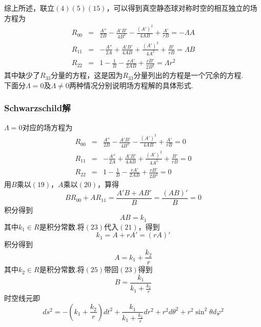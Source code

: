         综上所述，联立$(4)(5)(15)$，可以得到真空静态球对称时空的相互独立的场方程为
        \begin{eqnarray}
            R_{00}&=&\frac{A''}{2B}-\frac{A'B'}{4B^2}-\frac{(A')^2}{4AB}+\frac{A'}{rB}=-\Lambda A\\
            R_{11}&=&-\frac{A''}{2A}+\frac{A'B'}{4AB}+\frac{(A')^2}{4A^2}+\frac{B'}{rB}=\Lambda B\\
            R_{22}&=&1-\frac{1}{B}-\frac{rA'}{2AB}+\frac{rB'}{2B^2}=\Lambda r^2
        \end{eqnarray}
        其中缺少了$R_{33}$分量的方程，这是因为$R_{33}$分量列出的方程是一个冗余的方程.\\


        下面分$\Lambda=0$及$\Lambda\ne0$两种情况分别说明场方程解的具体形式.
        \subsubsection{Schwarzschild解}
        $\Lambda=0$对应的场方程为
        \begin{eqnarray}
            R_{00}&=&\frac{A''}{2B}-\frac{A'B'}{4B^2}-\frac{(A')^2}{4AB}+\frac{A'}{rB}=0\\
            R_{11}&=&-\frac{A''}{2A}+\frac{A'B'}{4AB}+\frac{(A')^2}{4A^2}+\frac{B'}{rB}=0\\
            R_{22}&=&1-\frac{1}{B}-\frac{rA'}{2AB}+\frac{rB'}{2B^2}=0
        \end{eqnarray}
        用$B$乘以$(19)$，$A$乘以$(20)$，算得
        \begin{equation}
            BR_{00}+AR_{11}=\frac{A'B+AB'}{B}=\frac{(AB)'}{B}=0
        \end{equation}
        积分得到
        \begin{equation}
            AB=k_1
        \end{equation}
        其中$k_1\in R$是积分常数.将$(23)$代入$(21)$，得到
        \begin{equation}
            k_1=A+rA'=(rA)'
        \end{equation}
        积分得到
        \begin{equation}
            A=k_1+\frac{k_2}{r}
        \end{equation}
        其中$k_2\in R$是积分常数.将$(25)$带回$(23)$得到
        \begin{equation}
            B=\frac{k_1}{k_1+\frac{k_2}{r}}
        \end{equation}
        时空线元即
        \begin{equation}
            ds^2=-\left(k_1+\frac{k_2}{r}\right)dt^2+\frac{k_1}{k_1+\frac{k_2}{r}}dr^2+r^2d\theta^2+r^2\sin^2\theta d\varphi^2
        \end{equation}
